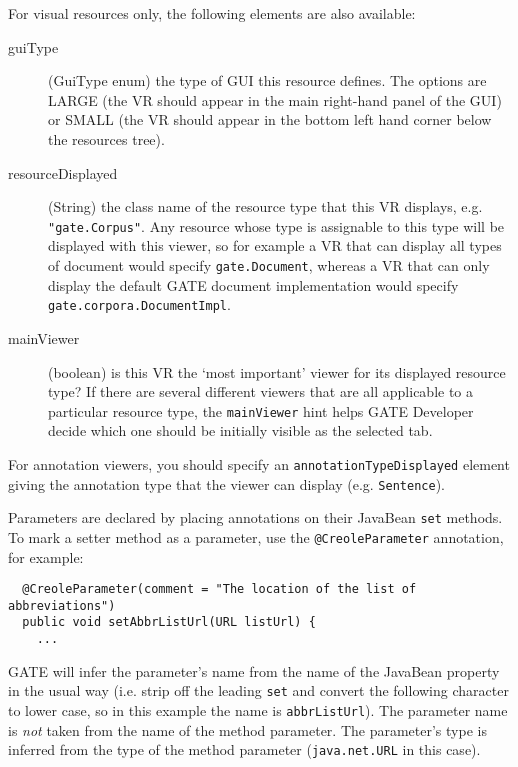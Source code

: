 For visual resources only, the following elements are also available:
\begin{description}
\item[guiType] (GuiType enum) the type of GUI this resource defines.
  The options are LARGE (the VR should appear in the main right-hand panel of
  the GUI) or SMALL (the VR should appear in the bottom left hand corner
  below the resources tree).
\item[resourceDisplayed] (String) the class name of the resource type that this
  VR displays, e.g. \verb|"gate.Corpus"|. Any resource whose type is assignable
  to this type will be displayed with this viewer, so for example a VR that can
  display all types of document would specify \verb|gate.Document|, whereas a
  VR that can only display the default GATE document implementation would
  specify \verb|gate.corpora.DocumentImpl|.
\item[mainViewer] (boolean) is this VR the `most important' viewer for its
  displayed resource type? If there are several different viewers that are all
  applicable to a particular resource type, the {\tt mainViewer} hint helps
  GATE Developer decide which one should be initially visible as the selected
  tab.
\end{description}

For annotation viewers, you should specify an
\verb|annotationTypeDisplayed| element giving the annotation type that the
viewer can display (e.g. {\tt Sentence}).


Parameters are declared by placing annotations on their JavaBean {\tt set}
methods.  To mark a setter method as a parameter, use the
\verb|@CreoleParameter| annotation, for example:

\begin{small}\begin{verbatim}
  @CreoleParameter(comment = "The location of the list of abbreviations")
  public void setAbbrListUrl(URL listUrl) {
    ...
\end{verbatim}\end{small}

GATE will infer the parameter's name from the name of the JavaBean property in
the usual way (i.e. strip off the leading {\tt set} and convert the following
character to lower case, so in this example the name is {\tt abbrListUrl}).
The parameter name is \emph{not} taken from the name of the method parameter.
The parameter's type is inferred from the type of the method parameter
({\tt java.net.URL} in this case).

